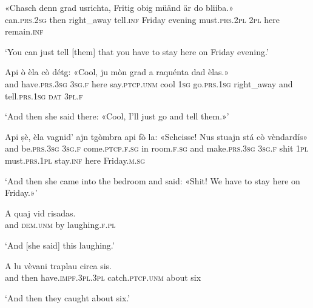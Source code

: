 \begin{linenumbers}
\gll   «Chasch denn grad usrichta, Fritig obig müänd är do bliiba.\footnotemark» \\
 can.\textsc{prs.2sg} then right\_away tell.\textsc{inf} Friday evening must.\textsc{prs.2pl} \textsc{2pl} here remain.\textsc{inf}   \\
\end{linenumbers}
\medskip
\glt `You can just tell [them] that you have to stay here on Friday evening.'
\medskip

\begin{linenumbers}
\gll    Api ò èla cò détg: «Cool, ju mòn grad a raquénta dad èlas.»\\
and have.\textsc{prs.3sg} \textsc{3sg.f} here say.\textsc{ptcp.unm} cool \textsc{1sg}  go.\textsc{prs.1sg} right\_away and tell.\textsc{prs.1sg} \textsc{dat} \textsc{3pl.f} \\
\end{linenumbers}
\medskip
\glt `And then she said there: «Cool, I’ll just go and tell them.»'
\medskip

\begin{linenumbers}
\gll Api ṣè, èla vagnid’ ajn tgòmbra api fò la: «Scheisse\footnotemark! Nus stuajn stá cò vèndardís»\\
and be.\textsc{prs.3sg} \textsc{3sg.f} come.\textsc{ptcp.f.sg} in room.\textsc{f.sg} and make.\textsc{prs.3sg} \textsc{3sg.f} shit \textsc{1pl} must.\textsc{prs.1pl} stay.\textsc{inf} here Friday.\textsc{m.sg}\\
\end{linenumbers}
\medskip
\glt `And then she came into the bedroom and said: «Shit!
We have to stay here on Friday.»'
\medskip

\begin{linenumbers}
\gll    A quaj vid risadas.\\
and \textsc{dem.unm} by laughing.\textsc{f.pl}\\
\end{linenumbers}
\medskip
\glt `And [she said] this laughing.'
\medskip

\begin{linenumbers}
\gll    A lu vèvani traplau circa sis.\\
and then have.\textsc{impf.3pl.3pl} catch.\textsc{ptcp.unm} about six \\
\end{linenumbers}
\medskip
\glt `And then they caught about six.'
\medskip

